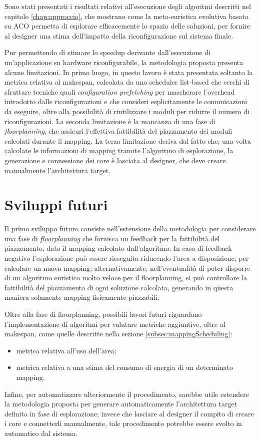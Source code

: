 Sono stati presentati i risultati relativi all'esecuzione degli algoritmi descritti
nel capitolo \ref{chap:approccio}, che mostrano come la meta-euristica evolutiva basata
su \acl{ACO} permetta di esplorare efficacemente lo spazio delle soluzioni,
per fornire al designer una stima dell'impatto della riconfigurazione sul sistema finale.

Pur permettendo di stimare lo speedup derivante dall'esecuzione di un'applicazione su hardware riconfigurabile,
la metodologia proposta presenta alcune limitazioni. In primo luogo, in questo lavoro \`e stata presentata
soltanto la metrica relativa al \mbox{makespan},
calcolata da uno scheduler list-based che cerchi di sfruttare tecniche quali
\emph{configuration prefetching} per mascherare l'overhead introdotto dalle
riconfigurazioni e che consideri esplicitamente le comunicazioni da eseguire, oltre
alla possibilit\`a di riutilizzare i moduli per ridurre il numero di riconfigurazioni.
La seconda limitazione \`e la mancanza di una fase di \emph{floorplanning}, che assicuri
l'effettiva fattibilit\`a del piazzamento dei moduli calcolati durante il mapping.
La terza limitazione deriva dal fatto che, una volta calcolate le informazioni di mapping
tramite l'algoritmo di esplorazione, la generazione e connessione dei core \`e lasciata
al designer, che deve creare manualmente l'architettura target.

\section{Sviluppi futuri}
\label{sec:sviluppiFuturi}
Il primo sviluppo futuro consiste nell'estensione della metodologia per considerare una fase di
\emph{floorplanning} che fornisca un feedback per la fattibilit\`a del piazzamento, dato
il mapping calcolato dall'algoritmo. In caso di feedback negativo l'esplorazione pu\`o essere rieseguita
riducendo l'area a disposizione, per calcolare un nuovo mapping; alternativamente, nell'eventualit\`a
di poter disporre di un algoritmo euristico molto veloce per il floorplanning, si pu\`o
controllare la fattibilit\`a del piazzamento di ogni soluzione calcolata, generando in questa maniera
solamente mapping fisicamente piazzabili.

Oltre alla fase di floorplanning, possibili lavori futuri riguardano l'implementazione di
algoritmi per valutare metriche aggiuntive, oltre al makespan, come quelle descritte
nella sezione \ref{subsec:mappingScheduling}:
\begin{itemize}
 \item metrica relativa all'uso dell'area;
 \item metrica relativa a una stima del consumo di energia di un determinato mapping.
\end{itemize}


Infine, per automatizzare ulteriormente il procedimento, sarebbe utile estendere la metodologia
proposta per generare automaticamente l'architettura target definita in fase di esplorazione; invece
che lasciare al designer il compito di creare i core e connetterli manualmente, tale procedimento
potrebbe essere svolto in automatico dal sistema.